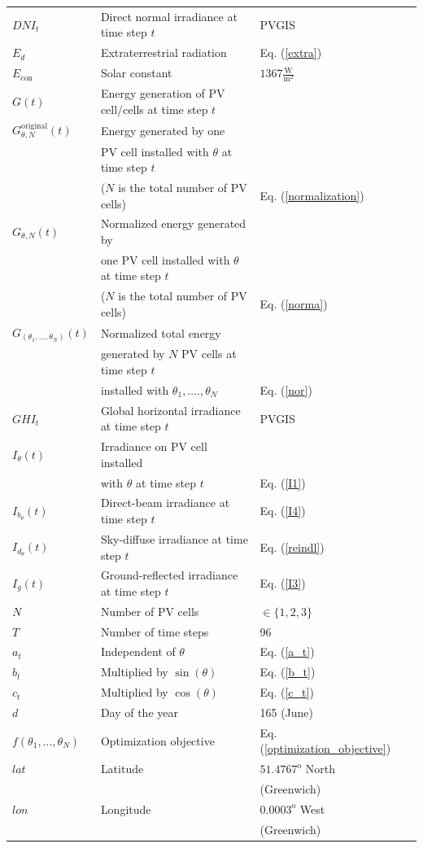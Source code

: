\begin{longtable}{@{}l*{2}{|l}l@{}}
$DNI_t$ &Direct normal irradiance at time step $t$  &PVGIS \cite{PVGIS} \\
$E_d$ & Extraterrestrial radiation &Eq. (\ref{extra}) \\
$E_{\mathrm{con}}$ & Solar constant &$1367\frac{\mathrm{W}}{\mathrm{m}^2}$ \cite{Solar_Cell_declination_inclination_angle}\\
$G(t)$ &Energy generation of PV cell/cells at time step $t$& \\
$G^{\text{original}}_{\theta,N}(t)$&Energy generated by one&\\
&PV cell installed with $\theta$ at time step $t$&\\
&($N$ is the total number of PV cells)&Eq. (\ref{normalization})\\
$G_{\theta,N}(t)$ &Normalized energy generated by&\\
& one PV cell installed with $\theta$ at time step $t$&\\
&($N$ is the total number of PV cells)&Eq. (\ref{norma})\\
$G_{(\theta_1, ..., \theta_N)}(t)$ &Normalized total energy&\\
& generated by $N$ PV cells at time step $t$&\\
&installed with $\theta_1, ....,\theta_N$&Eq. (\ref{nor})\\
$GHI_t$ &Global horizontal irradiance at time step $t$  &PVGIS \cite{PVGIS} \\
$I_{\theta}(t)$  &Irradiance on PV cell installed &\\
  & with $\theta$ at time step $t$&Eq. (\ref{I1})\\
$I_{b_\theta}(t)$ &Direct-beam irradiance at time step $t$&Eq.  (\ref{I4})\\
$I_{d_\theta}(t)$ &Sky-diffuse irradiance at time step $t$&Eq.  (\ref{reindl})\\
$I_{g}(t)$ &Ground-reflected irradiance at time step $t$&Eq.   (\ref{I3})\\ 
$N$ &Number of PV cells &$\in \{1,2,3\}$\\
$T$ &Number of time steps&96\\
$a_t$& Independent of $\theta$& Eq. (\ref{a_t})\\
$b_t$& Multiplied by  $\sin(\theta)$ &Eq.  (\ref{b_t})\\
$c_t$& Multiplied by  $\cos(\theta)$&Eq.  (\ref{c_t})\\
$d$ &Day of the year &165 (June)\\
$f(\theta_1, ..., \theta_N)$ &Optimization objective &Eq.  (\ref{optimization_objective})\\
$lat$ &Latitude  &$51.4767^{\mathrm{o}}$ North\\
 &  & (Greenwich)\\
$lon$ &Longitude &$0.0003^{\mathrm{o}}$ West\\
 &&(Greenwich)\\
\bottomrule
\end{longtable}



